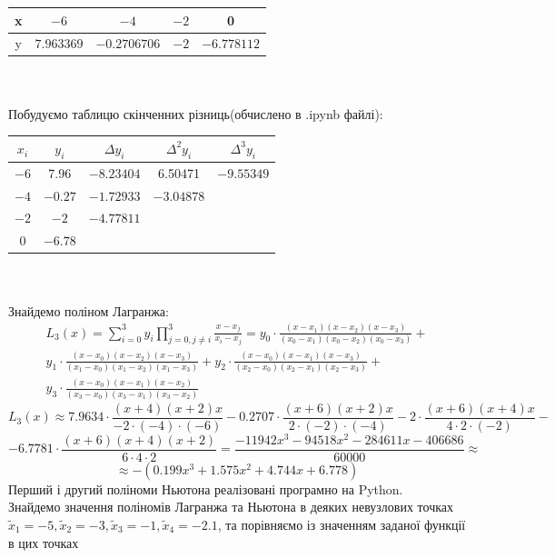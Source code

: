 \documentclass[14 pt]{extarticle}
\begin{document}
\begin{tabular}{|c|c|c|c|c|} \hline
    x& $-6$ & $-4$ & $-2$ & 0 \\ \hline 
    y& $7.963369$&$-0.2706706$&$-2$&$-6.778112$ \\ \hline
\end{tabular} \\ \\ 
Побудуємо таблицю скінченних різниць(обчислено в .ipynb файлі): \\ 
\begin{tabular}{|c|c|c|c|c|} \hline 
    $x_i$ & $y_i$ & $\Delta y_i$ & $\Delta^2 y_i$ & $\Delta^3 y_i$ \\ \hline 
    $-6$ & 7.96 & $-8.23404$ & 6.50471 & $-9.55349$ \\ \hline    
    $-4$ & $-0.27$ & $-1.72933$ & $-3.04878$ &  \\ \hline   
    $-2$ & $-2$ & $-4.77811$ & & \\ \hline
    0 & $-6.78$ & & & \\ \hline
\end{tabular} \\ \\ 
Знайдемо поліном Лагранжа:
\begin{align*}
    L_3(x) = \sum_{i=0}^3 y_i \prod_{j=0,j \neq i}^3 \frac{x-x_j}{x_i-x_j} = 
    y_0 \cdot \frac{(x-x_1 )(x-x_2 )(x-x_3 )}{(x_0 - x_1 )(x_0 - x_2 )(x_0 - x_3 )} +\\  
    y_1 \cdot \frac{(x-x_0 )(x-x_2 )(x-x_3 )}{(x_1 - x_0 )(x_1 - x_2 )(x_1 - x_3 )} +
    y_2 \cdot \frac{(x-x_0 )(x-x_1 )(x-x_3 )}{(x_2 - x_0 )(x_2 - x_1 )(x_2 - x_3 )} +\\
    y_3 \cdot \frac{(x-x_0 )(x-x_1 )(x-x_2 )}{(x_3 - x_0 )(x_3 - x_1 )(x_3 - x_2 )} 
\end{align*}
$$
L_3(x) \approx 
7.9634 \cdot \frac{(x+4)(x+2)x}{-2 \cdot (-4) \cdot (-6)} 
-0.2707 \cdot \frac{(x+6)(x+2)x}{2 \cdot (-2) \cdot (-4)}
- 2 \cdot \frac{(x+6)(x+4)x}{4 \cdot 2 \cdot (-2)} - $$$$
-6.7781 \cdot \frac{(x+6)(x+4)(x+2)}{6 \cdot 4 \cdot 2} = 
\frac{-11942x^3 - 94518x^2 - 284611x - 406686}{60000} \approx 
$$
$$
\approx -(0.199x^3 + 1.575 x^2 + 4.744 x + 6.778)
$$
Перший і другий поліноми Ньютона реалізовані програмно на Python. \\ 
Знайдемо значення поліномів Лагранжа та Ньютона в деяких невузлових точках \\  $\tilde{x}_1 = -5, \tilde{x}_2 = -3, \tilde{x}_3 = -1, \tilde{x}_4 = -2.1$, та порівняємо із значенням заданої функції в цих точках \\ 
\end{document}
